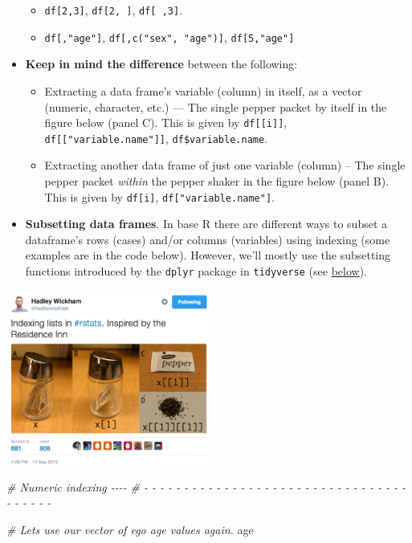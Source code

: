 \documentclass[
]{book}
\newenvironment{Shaded}{\begin{snugshade}}{\end{snugshade}}
\newcommand{\CommentTok}[1]{\textcolor[rgb]{0.56,0.35,0.01}{\textit{#1}}}
\newcommand{\NormalTok}[1]{#1}
\providecommand{\tightlist}{%
  \setlength{\itemsep}{0pt}\setlength{\parskip}{0pt}}
\begin{document}
\begin{itemize}
  \begin{itemize}
  \tightlist
  \item
    \texttt{df{[}2,3{]}}, \texttt{df{[}2,\ {]}}, \texttt{df{[}\ ,3{]}}.
  \item
    \texttt{df{[},"age"{]}}, \texttt{df{[},c("sex",\ "age"){]}}, \texttt{df{[}5,"age"{]}}
  \end{itemize}
\item
  \textbf{Keep in mind the difference} between the following:

  \begin{itemize}
  \tightlist
  \item
    Extracting a data frame's variable (column) in itself, as a vector (numeric, character, etc.) --- The single pepper packet by itself in the figure below (panel C). This is given by \texttt{df{[}{[}i{]}{]}}, \texttt{df{[}{[}"variable.name"{]}{]}}, \texttt{df\$variable.name}.
  \item
    Extracting another data frame of just one variable (column) -- The single pepper packet \emph{within} the pepper shaker in the figure below (panel B). This is given by \texttt{df{[}i{]}}, \texttt{df{[}"variable.name"{]}}.
  \end{itemize}
\item
  \textbf{Subsetting data frames}. In base R there are different ways to subset a dataframe's rows (cases) and/or columns (variables) using indexing (some examples are in the code below). However, we'll mostly use the subsetting functions introduced by the \texttt{dplyr} package in \texttt{tidyverse} (see \protect\hyperlink{the-tidyverse-syntax}{below}).
\end{itemize}

\href{https://twitter.com/hadleywickham/status/643381054758363136?lang=en}{\includegraphics[width=0.5\textwidth,height=\textheight]{./Figures/wickham_indexing_tweet.png}}

\begin{Shaded}
\begin{Highlighting}[]
\CommentTok{\# Numeric indexing                                                          {-}{-}{-}{-}}
\CommentTok{\# {-} {-} {-} {-} {-} {-} {-} {-} {-} {-} {-} {-} {-} {-} {-} {-} {-} {-} {-} {-} {-} {-} {-} {-} {-} {-} {-} {-} {-} {-} {-} {-} {-} {-} {-} {-} {-} {-} {-} }

\CommentTok{\# Let\textquotesingle{}s use our vector of ego age values again.}
\NormalTok{age}
\end{Highlighting}
\end{Shaded}
\end{document}

